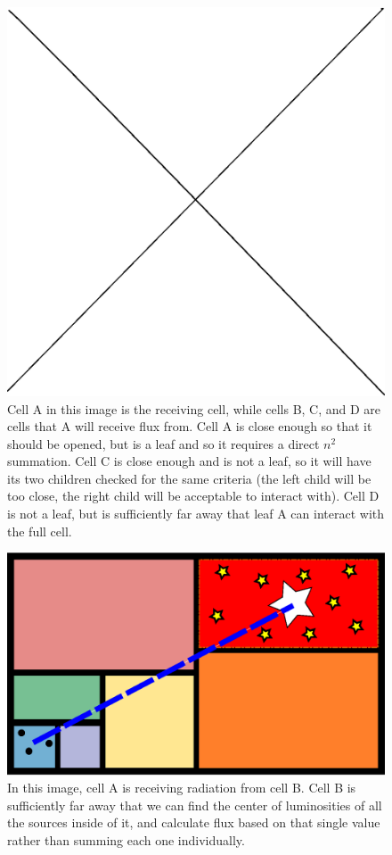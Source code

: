 \begin{figure}
\includegraphics[width=\textwidth]{graphics/placeholder.eps}
\caption[The opening angle criteria.]{Cell A in this image is the receiving cell, while cells B, C, and D are cells that A will receive flux from. Cell A is close enough so that it should be opened, but is a leaf and so it requires a direct $n^2$ summation. Cell C is close enough and is not a leaf, so it will have its two children checked for the same criteria (the left child will be too close, the right child will be acceptable to interact with). Cell D is not a leaf, but is sufficiently far away that leaf A can interact with the full cell.}
\label{fig:openinganglecriteria}
\end{figure}

\begin{figure}
\includegraphics[width=\textwidth]{graphics/flux.eps}
\caption[The exchange of radiation.]{In this image, cell A is receiving radiation from cell B. Cell B is sufficiently far away that we can find the center of luminosities of all the sources inside of it, and calculate flux based on that single value rather than summing each one individually.}
\label{fig:radexchange}
\end{figure}

